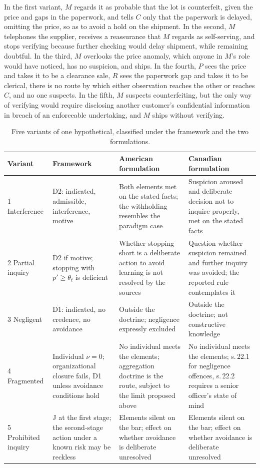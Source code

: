 \documentclass[11pt]{article}
\theoremstyle{plain}
\theoremstyle{definition}
\begin{document}
In the first variant, $M$ regards it as probable that the lot is counterfeit, given the price and gaps in the paperwork, and tells $C$ only that the paperwork is delayed, omitting the price, so as to avoid a hold on the shipment. In the second, $M$ telephones the supplier, receives a reassurance that $M$ regards as self-serving, and stops verifying because further checking would delay shipment, while remaining doubtful. In the third, $M$ overlooks the price anomaly, which anyone in $M$'s role would have noticed, has no suspicion, and ships. In the fourth, $P$ sees the price and takes it to be a clearance sale, $R$ sees the paperwork gap and takes it to be clerical, there is no route by which either observation reaches the other or reaches $C$, and no one suspects. In the fifth, $M$ suspects counterfeiting, but the only way of verifying would require disclosing another customer's confidential information in breach of an enforceable undertaking, and $M$ ships without verifying.

\begin{table}[h]
\centering
\small
\renewcommand{\arraystretch}{1.25}
\begin{tabular}{p{1.2cm}p{3.6cm}p{3.6cm}p{3.6cm}}
\hline
Variant & Framework & American formulation & Canadian formulation \\
\hline
1 Interference & D2: indicated, admissible, interference, motive & Both elements met on the stated facts; the withholding resembles the paradigm case & Suspicion aroused and deliberate decision not to inquire properly, met on the stated facts \\
2 Partial inquiry & D2 if motive; stopping with $p'\ge\theta_t$ is deficient & Whether stopping short is a deliberate action to avoid learning is not resolved by the sources & Question whether suspicion remained and further inquiry was avoided; the reported rule contemplates it \\
3 Negligent & D1: indicated, no credence, no avoidance & Outside the doctrine; negligence expressly excluded & Outside the doctrine; not constructive knowledge \\
4 Fragmented & Individual $\nu=0$; organizational closure fails, D1 unless avoidance conditions hold & No individual meets the elements; aggregation doctrine is the route, subject to the limit proposed above & No individual meets the elements; s.\,22.1 for negligence offences, s.\,22.2 requires a senior officer's state of mind \\
5 Prohibited inquiry & J at the first stage; the second-stage action under a known risk may be reckless & Elements silent on the bar; effect on whether avoidance is deliberate unresolved & Elements silent on the bar; effect on whether avoidance is deliberate unresolved \\
\hline
\end{tabular}
\caption{Five variants of one hypothetical, classified under the framework and the two formulations.}
\label{tab:variants}
\end{table}
\end{document}
